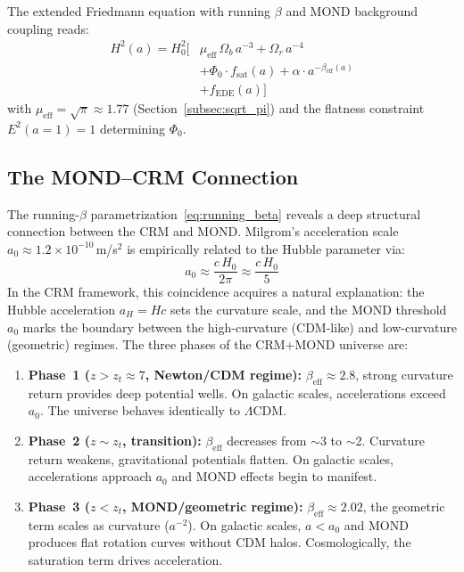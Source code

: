 \documentclass[aps,prd,twocolumn,superscriptaddress,nofootinbib]{revtex4-2}
\begin{document}
The extended Friedmann equation with running $\beta$ and MOND background coupling reads:
\begin{equation}
\begin{split}
H^2(a) = H_0^2 \Big[&\mu_{\mathrm{eff}}\,\Omega_b\,a^{-3} + \Omega_r\,a^{-4} \\
&+ \Phi_0 \cdot f_{\mathrm{sat}}(a) + \alpha \cdot a^{-\beta_{\mathrm{eff}}(a)} \\
&+ f_{\mathrm{EDE}}(a)\Big]
\end{split}
\label{eq:running_friedmann}
\end{equation}
with $\mu_{\mathrm{eff}} = \sqrt{\pi} \approx 1.77$ (Section~\ref{subsec:sqrt_pi}) and the flatness constraint $E^2(a{=}1) = 1$ determining $\Phi_0$.


\subsection{The MOND--CRM Connection}
\label{subsec:mond_cfm_connection}

The running-$\beta$ parametrization~\eqref{eq:running_beta} reveals a deep structural connection between the CRM and MOND. Milgrom's acceleration scale $a_0 \approx 1.2 \times 10^{-10}$\,m/s$^2$ is empirically related to the Hubble parameter via:
\begin{equation}
a_0 \approx \frac{c\,H_0}{2\pi} \approx \frac{c\,H_0}{5}
\end{equation}
In the CRM framework, this coincidence acquires a natural explanation: the Hubble acceleration $a_H = Hc$ sets the curvature scale, and the MOND threshold $a_0$ marks the boundary between the high-curvature (CDM-like) and low-curvature (geometric) regimes. The three phases of the CRM+MOND universe are:

\begin{enumerate}
\item \textbf{Phase~1 ($z > z_t \approx 7$, Newton/CDM regime):} $\beta_{\mathrm{eff}} \approx 2.8$, strong curvature return provides deep potential wells. On galactic scales, accelerations exceed $a_0$. The universe behaves identically to $\Lambda$CDM.

\item \textbf{Phase~2 ($z \sim z_t$, transition):} $\beta_{\mathrm{eff}}$ decreases from $\sim$3 to $\sim$2. Curvature return weakens, gravitational potentials flatten. On galactic scales, accelerations approach $a_0$ and MOND effects begin to manifest.

\item \textbf{Phase~3 ($z < z_t$, MOND/geometric regime):} $\beta_{\mathrm{eff}} \approx 2.02$, the geometric term scales as curvature ($a^{-2}$). On galactic scales, $a < a_0$ and MOND produces flat rotation curves without CDM halos. Cosmologically, the saturation term drives acceleration.
\end{enumerate}
\end{document}
